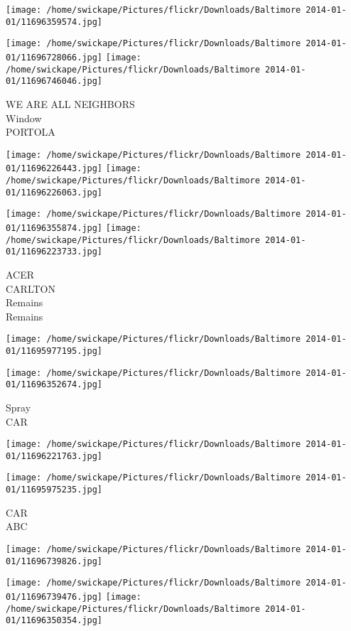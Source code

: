 \documentclass[10pt,letterpaper]{article}
\begin{document}
\texttt{[image: /home/swickape/Pictures/flickr/Downloads/Baltimore 2014-01-01/11696359574.jpg]}

\vspace{0.25in}
\texttt{[image: /home/swickape/Pictures/flickr/Downloads/Baltimore 2014-01-01/11696728066.jpg]}
\texttt{[image: /home/swickape/Pictures/flickr/Downloads/Baltimore 2014-01-01/11696746046.jpg]}

WE ARE ALL NEIGHBORS\\
Window\\
PORTOLA
\pagebreak

\texttt{[image: /home/swickape/Pictures/flickr/Downloads/Baltimore 2014-01-01/11696226443.jpg]}
\texttt{[image: /home/swickape/Pictures/flickr/Downloads/Baltimore 2014-01-01/11696226063.jpg]}

\texttt{[image: /home/swickape/Pictures/flickr/Downloads/Baltimore 2014-01-01/11696355874.jpg]}
\texttt{[image: /home/swickape/Pictures/flickr/Downloads/Baltimore 2014-01-01/11696223733.jpg]}

ACER\\
CARLTON\\
Remains\\
Remains
\pagebreak

\texttt{[image: /home/swickape/Pictures/flickr/Downloads/Baltimore 2014-01-01/11695977195.jpg]}

\vspace{0.25in}
\texttt{[image: /home/swickape/Pictures/flickr/Downloads/Baltimore 2014-01-01/11696352674.jpg]}

Spray\\
CAR
\pagebreak

\texttt{[image: /home/swickape/Pictures/flickr/Downloads/Baltimore 2014-01-01/11696221763.jpg]}

\vspace{0.25in}
\texttt{[image: /home/swickape/Pictures/flickr/Downloads/Baltimore 2014-01-01/11695975235.jpg]}

CAR\\
ABC
\pagebreak

\texttt{[image: /home/swickape/Pictures/flickr/Downloads/Baltimore 2014-01-01/11696739826.jpg]}

\vspace{0.25in}
\texttt{[image: /home/swickape/Pictures/flickr/Downloads/Baltimore 2014-01-01/11696739476.jpg]}
\texttt{[image: /home/swickape/Pictures/flickr/Downloads/Baltimore 2014-01-01/11696350354.jpg]}
\end{document}
